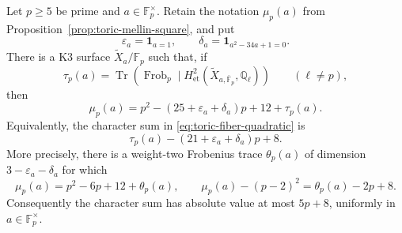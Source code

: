 \begin{theorem}
\label{thm:toric-fiber-K3}
Let $p\geq5$ be prime and $a\in\mathbb F_p^\times$.  Retain the
notation $\mu_p(a)$ from Proposition~\ref{prop:toric-mellin-square}, and put
\[
 \varepsilon_a=\mathbf 1_{a=1},\qquad
 \delta_a=\mathbf 1_{a^2-34a+1=0}.
\]
There is a K3 surface $\widetilde X_a/\mathbb F_p$ such that, if
\[
 \tau_p(a)=\operatorname {Tr}\!\left(
  \operatorname {Frob}_p\mid
  H^2_{\mathrm{et}}(\widetilde X_{a,\overline{\mathbb F}_p},
                    \mathbb Q_\ell)
 \right)
 \qquad(\ell\ne p),
\]
then
\begin{equation}
 \boxed{
  \mu_p(a)=p^2-(25+\varepsilon_a+\delta_a)p+12+\tau_p(a).}
 \label{eq:toric-K3-fiber-count}
\end{equation}
Equivalently, the character sum in
\eqref{eq:toric-fiber-quadratic} is
\begin{equation}
 \boxed{
 \tau_p(a)-(21+\varepsilon_a+\delta_a)p+8.}
 \label{eq:toric-K3-character-sum}
\end{equation}
More precisely, there is a weight-two Frobenius trace $\theta_p(a)$ of
dimension $3-\varepsilon_a-\delta_a$ for which
\begin{equation}
 \boxed{
  \mu_p(a)=p^2-6p+12+\theta_p(a),\qquad
  \mu_p(a)-(p-2)^2=\theta_p(a)-2p+8.}
 \label{eq:toric-K3-deflated-trace}
\end{equation}
Consequently the character sum has absolute value at most $5p+8$, uniformly in
$a\in\mathbb F_p^\times$.
\end{theorem}

